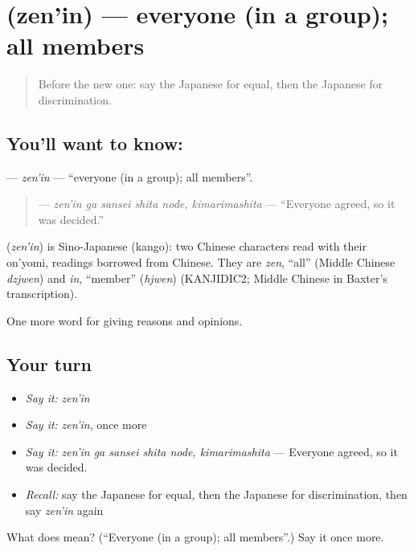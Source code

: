 \section[\texorpdfstring{\ja{ぜんいん} (zen'in)}{ぜんいん (zen'in)}]{ (zen'in) — everyone (in a group); all members}

\label{lesson:JA-C332-zen-in}



\begin{quote}
Before the new one: say the Japanese for equal, then the Japanese for discrimination.
\end{quote}

\subsection*{You'll want to know: }
\textbf{} — \emph{zen'in} — \textquotedblleft{}everyone (in a group); all members\textquotedblright{}.

\begin{quote}
\textbf{ } — \emph{zen'in ga sansei shita node, kimarimashita} — \textquotedblleft{}Everyone agreed, so it was decided.\textquotedblright{}
\end{quote}

\begin{cousinweb}
\textbf{} (\emph{zen'in}) is Sino-Japanese (kango): two Chinese characters read with their on'yomi, readings borrowed from Chinese. They are \emph{zen}, \textquotedblleft{}all\textquotedblright{} (Middle Chinese \emph{dzjwen}) and \emph{in}, \textquotedblleft{}member\textquotedblright{} (\emph{hjwen}) (KANJIDIC2; Middle Chinese in Baxter's transcription).
\end{cousinweb}

\begin{grammarlens}[title={What you've built}]
One more word for giving reasons and opinions.
\end{grammarlens}

\subsection*{Your turn}
\begin{itemize}
\raggedright
  \item \emph{Say it:} \emph{zen'in}
  \item \emph{Say it:} \emph{zen'in}, once more
  \item \emph{Say it:} \emph{zen'in ga sansei shita node, kimarimashita} — Everyone agreed, so it was decided.
  \item \emph{Recall:} say the Japanese for equal, then the Japanese for discrimination, then say \emph{zen'in} again
\end{itemize}

\begin{tcolorbox}[breakable,colback=teal!4,colframe=teal!35!black,title={Before you move on}]
What does  mean? (\textquotedblleft{}Everyone (in a group); all members\textquotedblright{}.) Say it once more.
\end{tcolorbox}
